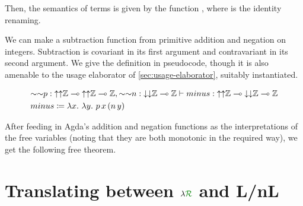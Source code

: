 Then, the semantics of terms is given by the function
\AgdaSpace{}\AgdaSpace{}%
, where  is the identity renaming.


\begin{example}\label{thm:minus}
  We can make a subtraction function from primitive addition and negation on
  integers.
  Subtraction is covariant in its first argument and contravariant in its
  second argument.
  We give the definition in pseudocode, though it is also amenable to the
  usage elaborator of \cref{sec:usage-elaborator}, suitably instantiated.

  \begin{align*}
    &{\sim\sim}p :
      {\uparrow\uparrow}\mathbb Z \multimap
      {\uparrow\uparrow}\mathbb Z \multimap \mathbb Z,
      {\sim\sim}n : {\downarrow\downarrow}\mathbb Z \multimap \mathbb Z
      \vdash \mathnormal{minus} :
      {\uparrow\uparrow}\mathbb Z \multimap
      {\downarrow\downarrow}\mathbb Z \multimap
      \mathbb Z
    \\
    &\mathnormal{minus} \coloneqq \lambda x.~\lambda y.~p\,x\,(n\,y)
  \end{align*}

  After feeding in Agda's addition and negation functions as the
  interpretations of the free variables (noting that they are both monotonic
  in the required way), we get the following free theorem.





\end{example}

\section{Translating between $\name$ and L/nL}\label{sec:lnl}


